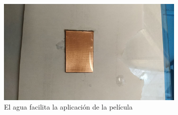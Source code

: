 \begin{figure}[!htb]
\begin{subfigure}[b]{.475\textwidth}
        \includegraphics[width=1\textwidth, trim={100 100 200 100}, clip]{tfg/figuras/06_prototipado/pelicula/agua_placa.png}
        \caption{El agua facilita la aplicación de la película}
        \label{fig:tfg:06:agua}
    \end{subfigure}%
    \hfill
    \begin{subfigure}[b]{.475\textwidth}
        \centering

\end{subfigure}
\end{figure}
